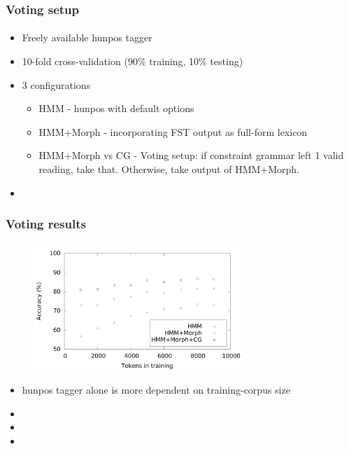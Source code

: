 \documentclass{beamer}
\begin{document}
\begin{frame}
\frametitle{Voting setup}
\framesubtitle{}
\begin{itemize}
	\item Freely available hunpos tagger
	\pause
	\item 10-fold cross-validation (90\% training, 10\% testing)
	\pause
	\item 3 configurations
	\begin{itemize}
		\item HMM - hunpos with default options
		\pause
		\item HMM+Morph - incorporating FST output as full-form lexicon
		\pause
		\item HMM+Morph vs CG - Voting setup: if constraint grammar left 1 valid reading,
		take that. Otherwise, take output of HMM+Morph.
	\end{itemize}
	\item 
\end{itemize}
\end{frame}

\begin{frame}
\frametitle{Voting results}
\framesubtitle{}
\begin{figure}
  \centering
  \includegraphics[width=0.70\textwidth]{graphics/learning-curve.pdf}
  \label{fig:curve}
\end{figure}
\begin{itemize}
	\item hunpos tagger alone is more dependent on training-corpus size
	\pause
	\item 
	\pause
	\item 
	\item 
\end{itemize}
\end{frame}
\end{document}
